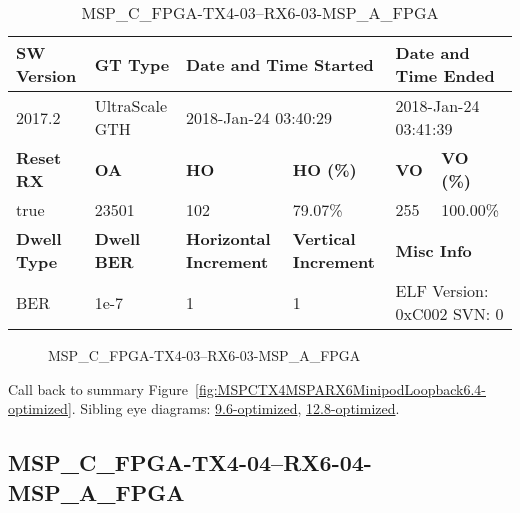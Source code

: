 \begin{table}[h]
\centering
\caption{MSP\_C\_FPGA-TX4-03--RX6-03-MSP\_A\_FPGA}
\label{tab:MSPCFPGATX403RX603MSPAFPGA6.4-optimized}
\begin{tabular}{@{}|l|l|l|l|l|l|@{}}
\toprule
\textbf{SW Version}                & \textbf{GT Type}   & \multicolumn{2}{l|}{\textbf{Date and Time Started}}            & \multicolumn{2}{l|}{\textbf{Date and Time Ended}}        \\ \midrule
2017.2                       & UltraScale GTH          & \multicolumn{2}{l|}{2018-Jan-24 03:40:29}                   & \multicolumn{2}{l|}{2018-Jan-24 03:41:39}               \\ \midrule
\textbf{Reset RX}                  & \textbf{OA} & \textbf{HO}   & \textbf{HO (\%)} & \textbf{VO} & \textbf{VO (\%)} \\ \midrule
true & 23501        & 102          & 79.07\%        & 255        & 100.00\%       \\ \midrule
\textbf{Dwell Type}                & \textbf{Dwell BER} & \textbf{Horizontal Increment} & \textbf{Vertical Increment}    & \multicolumn{2}{l|}{\textbf{Misc Info}}                  \\ \midrule
BER                            & 1e-7        & 1        & 1           & \multicolumn{2}{l|}{ELF Version: 0xC002 SVN: 0}                         \\ \bottomrule
\end{tabular}
\end{table}

\begin{figure}[h]
\caption{MSP\_C\_FPGA-TX4-03--RX6-03-MSP\_A\_FPGA} \label{fig:MSPCFPGATX403RX603MSPAFPGA6.4-optimized}
\end{figure}

Call back to summary Figure~\ref{fig:MSPCTX4MSPARX6MinipodLoopback6.4-optimized}.
Sibling eye diagrams: \hyperref[sec:MSPCFPGATX403RX603MSPAFPGA9.6-optimized]{9.6-optimized}, \hyperref[sec:MSPCFPGATX403RX603MSPAFPGA12.8-optimized]{12.8-optimized}.

\clearpage
\newpage


\subsection{MSP\_C\_FPGA-TX4-04--RX6-04-MSP\_A\_FPGA}\label{sec:MSPCFPGATX404RX604MSPAFPGA6.4-optimized}

